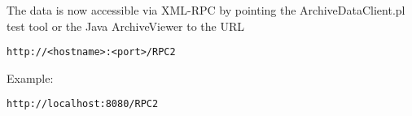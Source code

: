 \noindent The data is now accessible via XML-RPC by
pointing the ArchiveDataClient.pl test tool or the Java
ArchiveViewer to the URL
\begin{lstlisting}[keywordstyle=\sffamily]
     http://<hostname>:<port>/RPC2
\end{lstlisting}
\noindent Example:
\begin{lstlisting}[keywordstyle=\sffamily]
    http://localhost:8080/RPC2
\end{lstlisting}

